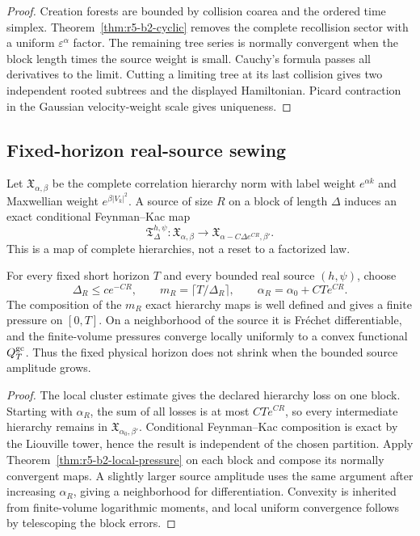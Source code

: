 \begin{proof}
Creation forests are bounded by collision coarea and the ordered time simplex.
Theorem~\ref{thm:r5-b2-cyclic} removes the complete recollision sector with a
uniform \(\varepsilon^\alpha\) factor.  The remaining tree series is normally
convergent when the block length times the source weight is small.  Cauchy's
formula passes all derivatives to the limit.  Cutting a limiting tree at its
last collision gives two independent rooted subtrees and the displayed
Hamiltonian.  Picard contraction in the Gaussian velocity-weight scale gives
uniqueness.
\end{proof}

\subsection{Fixed-horizon real-source sewing}

Let \(\mathfrak X_{\alpha,\beta}\) be the complete correlation hierarchy norm
with label weight \(e^{\alpha k}\) and Maxwellian weight
\(e^{\beta|V_k|^2}\).  A source of size \(R\) on a block of length \(\Delta\)
induces an exact conditional Feynman--Kac map
\[
 \mathfrak T_{\Delta}^{h,\psi}:
 \mathfrak X_{\alpha,\beta}\longrightarrow
 \mathfrak X_{\alpha-C\Delta e^{CR},\beta'}.
\]
This is a map of complete hierarchies, not a reset to a factorized law.

\begin{theorem}
\label{thm:r5-b2-sewing}
For every fixed short horizon \(T\) and every bounded real source
\((h,\psi)\), choose
\[
 \Delta_R\le ce^{-CR},
 \qquad m_R=\lceil T/\Delta_R\rceil,
 \qquad \alpha_R=\alpha_0+CTe^{CR}.
\]
The composition of the \(m_R\) exact hierarchy maps is well defined and gives
a finite pressure on \([0,T]\).  On a neighborhood of the source it is
Fr\'echet differentiable, and the finite-volume pressures converge locally
uniformly to a convex functional \(Q_T^{\rm gc}\).  Thus the fixed physical
horizon does not shrink when the bounded source amplitude grows.
\end{theorem}

\begin{proof}
The local cluster estimate gives the declared hierarchy loss on one block.
Starting with \(\alpha_R\), the sum of all losses is at most
\(CTe^{CR}\), so every intermediate hierarchy remains in
\(\mathfrak X_{\alpha_0,\beta'}\).  Conditional Feynman--Kac composition is
exact by the Liouville tower, hence the result is independent of the chosen
partition.  Apply Theorem~\ref{thm:r5-b2-local-pressure} on each block and
compose its normally convergent maps.  A slightly larger source amplitude
uses the same argument after increasing \(\alpha_R\), giving a neighborhood
for differentiation.  Convexity is inherited from finite-volume logarithmic
moments, and local uniform convergence follows by telescoping the block errors.
\end{proof}

